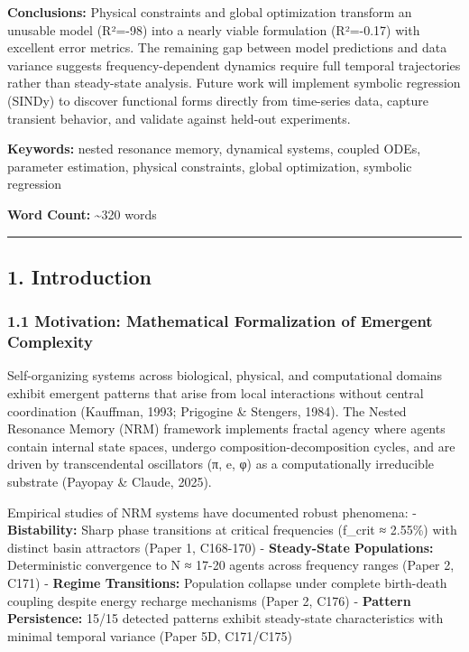 \documentclass[
]{article}
\begin{document}
\textbf{Conclusions:} Physical constraints and global optimization
transform an unusable model (R²=-98) into a nearly viable formulation
(R²=-0.17) with excellent error metrics. The remaining gap between model
predictions and data variance suggests frequency-dependent dynamics
require full temporal trajectories rather than steady-state analysis.
Future work will implement symbolic regression (SINDy) to discover
functional forms directly from time-series data, capture transient
behavior, and validate against held-out experiments.

\textbf{Keywords:} nested resonance memory, dynamical systems, coupled
ODEs, parameter estimation, physical constraints, global optimization,
symbolic regression

\textbf{Word Count:} \textasciitilde320 words

\begin{center}\rule{0.5\linewidth}{0.5pt}\end{center}

\subsection{1. Introduction}\label{introduction}

\subsubsection{1.1 Motivation: Mathematical Formalization of Emergent
Complexity}\label{motivation-mathematical-formalization-of-emergent-complexity}

Self-organizing systems across biological, physical, and computational
domains exhibit emergent patterns that arise from local interactions
without central coordination (Kauffman, 1993; Prigogine \& Stengers,
1984). The Nested Resonance Memory (NRM) framework implements fractal
agency where agents contain internal state spaces, undergo
composition-decomposition cycles, and are driven by transcendental
oscillators (π, e, φ) as a computationally irreducible substrate
(Payopay \& Claude, 2025).

Empirical studies of NRM systems have documented robust phenomena: -
\textbf{Bistability:} Sharp phase transitions at critical frequencies
(f\_crit ≈ 2.55\%) with distinct basin attractors (Paper 1, C168-170) -
\textbf{Steady-State Populations:} Deterministic convergence to N ≈
17-20 agents across frequency ranges (Paper 2, C171) - \textbf{Regime
Transitions:} Population collapse under complete birth-death coupling
despite energy recharge mechanisms (Paper 2, C176) - \textbf{Pattern
Persistence:} 15/15 detected patterns exhibit steady-state
characteristics with minimal temporal variance (Paper 5D, C171/C175)
\end{document}
